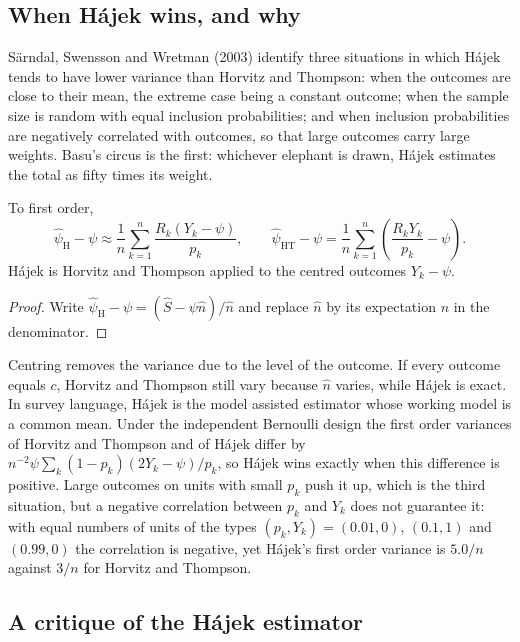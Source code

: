 \subsection{When H\'ajek wins, and why}

S\"arndal, Swensson and Wretman (2003) identify three situations in which H\'ajek tends to have lower variance than Horvitz and Thompson: when the outcomes are close to their mean, the extreme case being a constant outcome; when the sample size is random with equal inclusion probabilities; and when inclusion probabilities are negatively correlated with outcomes, so that large outcomes carry large weights. Basu's circus is the first: whichever elephant is drawn, H\'ajek estimates the total as fifty times its weight.



\begin{proposition}
To first order,
\[
\hat\psi_{\mathrm{H}} - \psi \approx \frac{1}{n}\sum_{k=1}^n \frac{R_k(Y_k - \psi)}{p_k},
\qquad
\hat\psi_{\mathrm{HT}} - \psi = \frac{1}{n}\sum_{k=1}^n \left(\frac{R_kY_k}{p_k} - \psi\right).
\]
H\'ajek is Horvitz and Thompson applied to the centred outcomes $Y_k - \psi$.
\end{proposition}

\begin{proof}
Write $\hat\psi_{\mathrm{H}} - \psi = (\hat S - \psi\hat n)/\hat n$ and replace $\hat n$ by its expectation $n$ in the denominator.
\end{proof}

Centring removes the variance due to the level of the outcome. If every outcome equals $c$, Horvitz and Thompson still vary because $\hat n$ varies, while H\'ajek is exact. In survey language, H\'ajek is the model assisted estimator whose working model is a common mean. Under the independent Bernoulli design the first order variances of Horvitz and Thompson and of H\'ajek differ by $n^{-2}\psi\sum_k (1 - p_k)(2Y_k - \psi)/p_k$, so H\'ajek wins exactly when this difference is positive. Large outcomes on units with small $p_k$ push it up, which is the third situation, but a negative correlation between $p_k$ and $Y_k$ does not guarantee it: with equal numbers of units of the types $(p_k, Y_k) = (0.01, 0)$, $(0.1, 1)$ and $(0.99, 0)$ the correlation is negative, yet H\'ajek's first order variance is $5.0/n$ against $3/n$ for Horvitz and Thompson.

\subsection{A critique of the H\'ajek estimator}

